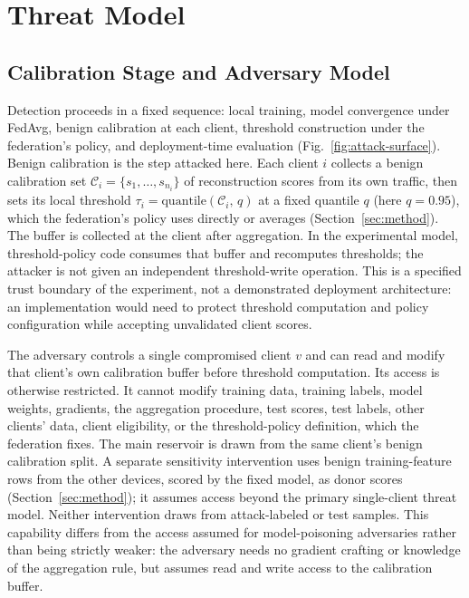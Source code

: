 \section{Threat Model}
\label{sec:threat}

\subsection{Calibration Stage and Adversary Model}

Detection proceeds in a fixed sequence: local training, model convergence under FedAvg, benign calibration at each client, threshold construction under the federation's policy, and deployment-time evaluation (Fig.~\ref{fig:attack-surface}).
Benign calibration is the step attacked here.
Each client $i$ collects a benign calibration set $\mathcal{C}_i = \{s_1, \ldots, s_{n_i}\}$ of reconstruction scores from its own traffic, then sets its local threshold $\tau_i = \mathrm{quantile}(\mathcal{C}_i,\, q)$ at a fixed quantile $q$ (here $q{=}0.95$), which the federation's policy uses directly or averages (Section~\ref{sec:method}).
The buffer is collected at the client after aggregation. In the experimental model, threshold-policy code consumes that buffer and recomputes thresholds; the attacker is not given an independent threshold-write operation. This is a specified trust boundary of the experiment, not a demonstrated deployment architecture: an implementation would need to protect threshold computation and policy configuration while accepting unvalidated client scores.

The adversary controls a single compromised client $v$ and can read and modify that client's own calibration buffer before threshold computation. Its access is otherwise restricted.
It cannot modify training data, training labels, model weights, gradients, the aggregation procedure, test scores, test labels, other clients' data, client eligibility, or the threshold-policy definition, which the federation fixes.
The main reservoir is drawn from the same client's benign calibration split. A separate sensitivity intervention uses benign training-feature rows from the other devices, scored by the fixed model, as donor scores (Section~\ref{sec:method}); it assumes access beyond the primary single-client threat model. Neither intervention draws from attack-labeled or test samples.
This capability differs from the access assumed for model-poisoning adversaries rather than being strictly weaker: the adversary needs no gradient crafting or knowledge of the aggregation rule, but assumes read and write access to the calibration buffer.

